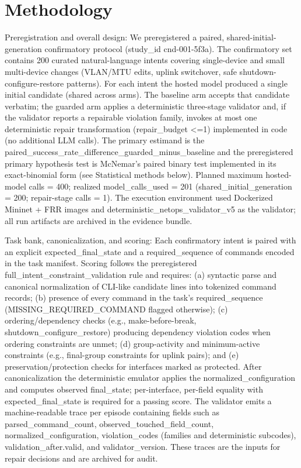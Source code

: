 \documentclass[conference]{IEEEtran}
\begin{document}
\section{Methodology}
Preregistration and overall design: We preregistered a paired, shared-initial-generation confirmatory protocol (study\_id cnd-001-5f3a). The confirmatory set contains 200 curated natural-language intents covering single-device and small multi-device changes (VLAN/MTU edits, uplink switchover, safe shutdown-configure-restore patterns). For each intent the hosted model produced a single initial candidate (shared across arms). The baseline arm accepts that candidate verbatim; the guarded arm applies a deterministic three-stage validator and, if the validator reports a repairable violation family, invokes at most one deterministic repair transformation (repair\_budget <=1) implemented in code (no additional LLM calls). The primary estimand is the paired\_success\_rate\_difference\_guarded\_minus\_baseline and the preregistered primary hypothesis test is McNemar's paired binary test implemented in its exact-binomial form (see Statistical methods below). Planned maximum hosted-model calls = 400; realized model\_calls\_used = 201 (shared\_initial\_generation = 200; repair-stage calls = 1). The execution environment used Dockerized Mininet + FRR images and deterministic\_netops\_validator\_v5 as the validator; all run artifacts are archived in the evidence bundle.

Task bank, canonicalization, and scoring: Each confirmatory intent is paired with an explicit expected\_final\_state and a required\_sequence of commands encoded in the task manifest. Scoring follows the preregistered full\_intent\_constraint\_validation rule and requires: (a) syntactic parse and canonical normalization of CLI-like candidate lines into tokenized command records; (b) presence of every command in the task's required\_sequence (MISSING\_REQUIRED\_COMMAND flagged otherwise); (c) ordering/dependency checks (e.g., make-before-break, shutdown\_configure\_restore) producing dependency violation codes when ordering constraints are unmet; (d) group-activity and minimum-active constraints (e.g., final-group constraints for uplink pairs); and (e) preservation/protection checks for interfaces marked as protected. After canonicalization the deterministic emulator applies the normalized\_configuration and computes observed final\_state; per-interface, per-field equality with expected\_final\_state is required for a passing score. The validator emits a machine-readable trace per episode containing fields such as parsed\_command\_count, observed\_touched\_field\_count, normalized\_configuration, violation\_codes (families and deterministic subcodes), validation\_after.valid, and validator\_version. These traces are the inputs for repair decisions and are archived for audit.
\end{document}
